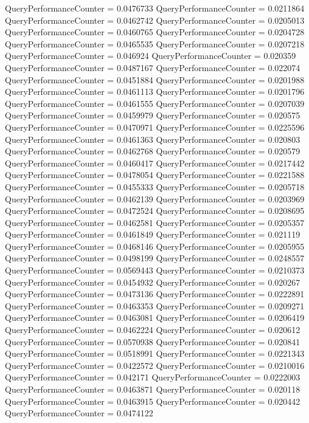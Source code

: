 \documentclass[9pt]{article}
\theoremstyle{plain}
\theoremstyle{definition}
\theoremstyle{remark}
\numberwithin{equation}{section}
\begin{document}
QueryPerformanceCounter  =  0.0476733
QueryPerformanceCounter  =  0.0211864
QueryPerformanceCounter  =  0.0462742
QueryPerformanceCounter  =  0.0205013
QueryPerformanceCounter  =  0.0460765
QueryPerformanceCounter  =  0.0204728
QueryPerformanceCounter  =  0.0465535
QueryPerformanceCounter  =  0.0207218
QueryPerformanceCounter  =  0.046924
QueryPerformanceCounter  =  0.020359
QueryPerformanceCounter  =  0.0487167
QueryPerformanceCounter  =  0.022074
QueryPerformanceCounter  =  0.0451884
QueryPerformanceCounter  =  0.0201988
QueryPerformanceCounter  =  0.0461113
QueryPerformanceCounter  =  0.0201796
QueryPerformanceCounter  =  0.0461555
QueryPerformanceCounter  =  0.0207039
QueryPerformanceCounter  =  0.0459979
QueryPerformanceCounter  =  0.020575
QueryPerformanceCounter  =  0.0470971
QueryPerformanceCounter  =  0.0225596
QueryPerformanceCounter  =  0.0461363
QueryPerformanceCounter  =  0.020803
QueryPerformanceCounter  =  0.0462768
QueryPerformanceCounter  =  0.020579
QueryPerformanceCounter  =  0.0460417
QueryPerformanceCounter  =  0.0217442
QueryPerformanceCounter  =  0.0478054
QueryPerformanceCounter  =  0.0221588
QueryPerformanceCounter  =  0.0455333
QueryPerformanceCounter  =  0.0205718
QueryPerformanceCounter  =  0.0462139
QueryPerformanceCounter  =  0.0203969
QueryPerformanceCounter  =  0.0472524
QueryPerformanceCounter  =  0.0208695
QueryPerformanceCounter  =  0.0462581
QueryPerformanceCounter  =  0.0205357
QueryPerformanceCounter  =  0.0461849
QueryPerformanceCounter  =  0.021119
QueryPerformanceCounter  =  0.0468146
QueryPerformanceCounter  =  0.0205955
QueryPerformanceCounter  =  0.0498199
QueryPerformanceCounter  =  0.0248557
QueryPerformanceCounter  =  0.0569443
QueryPerformanceCounter  =  0.0210373
QueryPerformanceCounter  =  0.0454932
QueryPerformanceCounter  =  0.020267
QueryPerformanceCounter  =  0.0473136
QueryPerformanceCounter  =  0.0222891
QueryPerformanceCounter  =  0.0463353
QueryPerformanceCounter  =  0.0209271
QueryPerformanceCounter  =  0.0463081
QueryPerformanceCounter  =  0.0206419
QueryPerformanceCounter  =  0.0462224
QueryPerformanceCounter  =  0.020612
QueryPerformanceCounter  =  0.0570938
QueryPerformanceCounter  =  0.020841
QueryPerformanceCounter  =  0.0518991
QueryPerformanceCounter  =  0.0221343
QueryPerformanceCounter  =  0.0422572
QueryPerformanceCounter  =  0.0210016
QueryPerformanceCounter  =  0.042171
QueryPerformanceCounter  =  0.0222003
QueryPerformanceCounter  =  0.0463871
QueryPerformanceCounter  =  0.020118
QueryPerformanceCounter  =  0.0463915
QueryPerformanceCounter  =  0.020442
QueryPerformanceCounter  =  0.0474122
\end{document}

